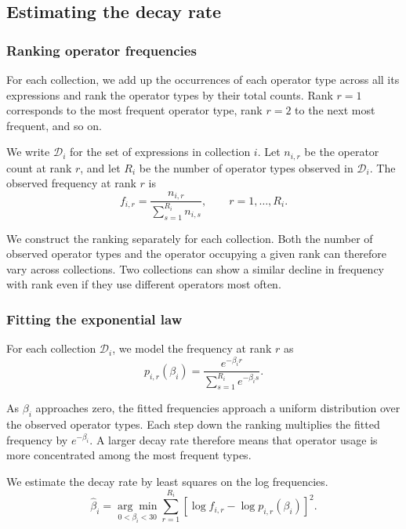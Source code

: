 \documentclass[10pt]{article}
\begin{document}
\subsection{Estimating the decay rate}\label{sec:methods}

\subsubsection{Ranking operator frequencies}

For each collection, we add up the occurrences of each operator type across all its expressions and rank the operator types by their total counts. Rank $r=1$ corresponds to the most frequent operator type, rank $r=2$ to the next most frequent, and so on.

We write $\mathcal{D}_i$ for the set of expressions in collection $i$. Let $n_{i,r}$ be the operator count at rank $r$, and let $R_i$ be the number of operator types observed in $\mathcal{D}_i$. The observed frequency at rank $r$ is
\[
f_{i,r}=\frac{n_{i,r}}{\sum_{s=1}^{R_i}n_{i,s}},
\qquad r=1,\ldots,R_i.
\]

We construct the ranking separately for each collection. Both the number of observed operator types and the operator occupying a given rank can therefore vary across collections. Two collections can show a similar decline in frequency with rank even if they use different operators most often.

\subsubsection{Fitting the exponential law}

For each collection $\mathcal{D}_i$, we model the frequency at rank $r$ as
\begin{equation}
p_{i,r}(\beta_i)=\frac{e^{-\beta_i r}}{\sum_{s=1}^{R_i}e^{-\beta_i s}}.
\label{eq:law}
\end{equation}

As $\beta_i$ approaches zero, the fitted frequencies approach a uniform distribution over the observed operator types. Each step down the ranking multiplies the fitted frequency by $e^{-\beta_i}$. A larger decay rate therefore means that operator usage is more concentrated among the most frequent types.

We estimate the decay rate by least squares on the log frequencies.
\begin{equation}
\hat{\beta}_i
=
\underset{0<\beta_i<30}{\arg\min}
\sum_{r=1}^{R_i}
\left[\log f_{i,r}-\log p_{i,r}(\beta_i)\right]^2.
\label{eq:logls}
\end{equation}
\end{document}
